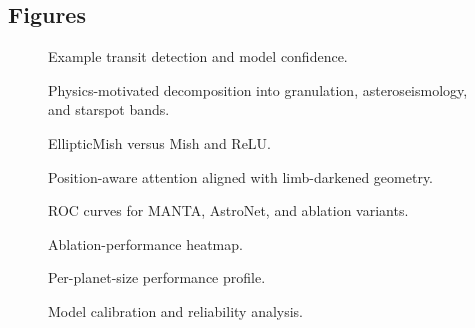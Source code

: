 \documentclass[11pt]{article}
\begin{document}
\subsection{Figures}
\begin{figure}[t]
  \centering
  \caption{Example transit detection and model confidence.}
  \label{fig:transit_detection}
\end{figure}

\begin{figure}[t]
  \centering
  \caption{Physics-motivated decomposition into granulation, asteroseismology,
and starspot bands.}
  \label{fig:frequency_decomposition}
\end{figure}

\begin{figure}[t]
  \centering
  \caption{EllipticMish versus Mish and ReLU.}
  \label{fig:activation_comparison}
\end{figure}

\begin{figure}[t]
  \centering
  \caption{Position-aware attention aligned with limb-darkened geometry.}
  \label{fig:attention_weights}
\end{figure}

\begin{figure}[t]
  \centering
  \caption{ROC curves for MANTA, AstroNet, and ablation variants.}
  \label{fig:roc_curves}
\end{figure}

\begin{figure}[t]
  \centering
  \caption{Ablation-performance heatmap.}
  \label{fig:ablation_heatmap}
\end{figure}

\begin{figure}[t]
  \centering
  \caption{Per-planet-size performance profile.}
  \label{fig:planet_size}
\end{figure}

\begin{figure}[t]
  \centering
  \caption{Model calibration and reliability analysis.}
  \label{fig:calibration}
\end{figure}
\end{document}
